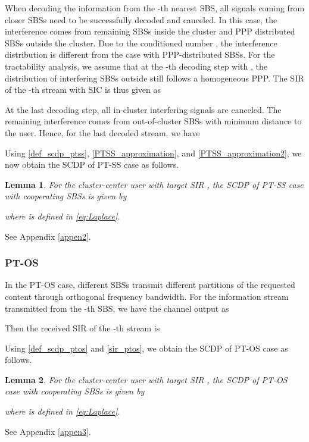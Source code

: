 \documentclass[twocolumns,10pt]{IEEEtran}
\newtheorem{lemma}{Lemma}
\begin{document}
When decoding the information from the -th nearest SBS, all signals coming from closer SBSs  need to be successfully decoded and canceled.
In this case, the interference comes from  remaining SBSs inside the cluster and PPP distributed SBSs outside the cluster. Due to the conditioned number , the interference distribution is different from the case with PPP-distributed SBSs.
For the tractability analysis, we assume that at the -th decoding step with , the distribution of interfering SBSs outside  still follows a homogeneous PPP. The SIR of the -th stream with SIC is thus given as
 

At the last decoding step, all in-cluster interfering signals are canceled. The remaining interference comes from out-of-cluster SBSs with minimum distance  to the user. Hence, for the last decoded stream, we have 
 
Using \eqref{def_scdp_ptss}, \eqref{PTSS_approximation}, and \eqref{PTSS_approximation2}, we now obtain the SCDP of PT-SS case as follows.

\begin{lemma}
	\label{lemma2}
	For the cluster-center user with target SIR ,
	the SCDP of PT-SS case with  cooperating SBSs is given by
	
	where  is defined in \eqref{eq:Laplace}. 
\end{lemma}
\begin{IEEEproof}
	\textnormal{See Appendix \ref{appen2}.}
\end{IEEEproof}


\subsubsection{PT-OS}
In the PT-OS case, different SBSs transmit different partitions of the requested content through orthogonal frequency bandwidth. For the information stream transmitted from the -th SBS, we have the channel output as
 
Then the received SIR of the -th stream is 
 
Using \eqref{def_scdp_ptos} and \eqref{sir_ptos}, we obtain the SCDP of PT-OS case as follows.

\begin{lemma}
	\label{lemma3}
	For the cluster-center user with target SIR ,
	the SCDP of PT-OS case with  cooperating SBSs is given by 
  	
	where  is defined in \eqref{eq:Laplace}. 
\end{lemma}
\begin{IEEEproof}
	\textnormal{See Appendix \ref{appen3}.}
\end{IEEEproof}
\end{document}
